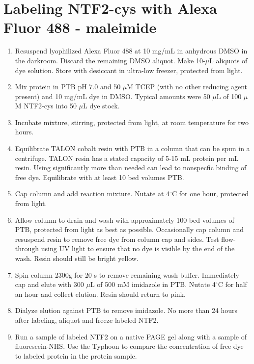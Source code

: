 \section{Labeling NTF2-cys with Alexa Fluor 488 - maleimide}
\begin{enumerate}
\item Resuspend lyophilized Alexa Fluor 488 at 10 mg/mL in anhydrous DMSO in the darkroom.  Discard the remaining DMSO aliquot.  Make 10-$\mu$L aliquots of dye solution. Store with desiccant in ultra-low freezer, protected from light.
\item Mix protein in PTB pH 7.0 and 50 $\mu$M TCEP (with no other reducing agent present) and 10 mg/mL dye in DMSO.  Typical amounts were 50 $\mu$L of 100 $\mu$M NTF2-cys into 50 $\mu$L dye stock.
\item Incubate mixture, stirring, protected from light, at room temperature for two hours.
\item Equilibrate TALON cobalt resin with PTB in a column that can be spun in a centrifuge.  TALON resin has a stated capacity of 5-15 mL protein per mL resin.  Using significantly more than needed can lead to nonspecfic binding of free dye.  Equilibrate with at least 10 bed volumes PTB.
\item Cap column and add reaction mixture.  Nutate at 4$^\circ$C for one hour, protected from light.
\item Allow column to drain and wash with approximately 100 bed volumes of PTB, protected from light as best as possible.  Occasionally cap column and resuspend resin to remove free dye from column cap and sides.  Test flow-through using UV light to ensure that no dye is visible by the end of the wash.  Resin should still be bright yellow.
\item Spin column 2300g for 20 s to remove remaining wash buffer.  Immediately cap and elute with 300 $\mu$L of 500 mM imidazole in PTB.  Nutate 4$^\circ$C for half an hour and collect elution.  Resin should return to pink.
\item Dialyze elution against PTB to remove imidazole.  No more than 24 hours after labeling, aliquot and freeze labeled NTF2.
\item Run a sample of labeled NTF2 on a native PAGE gel along with a sample of fluorescein-NHS.  Use the Typhoon to compare the concentration of free dye to labeled protein in the protein sample.

\end{enumerate}
